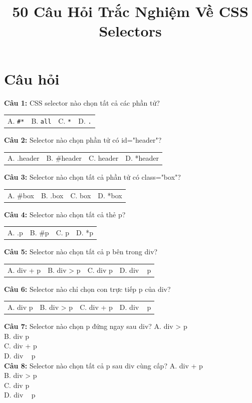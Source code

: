 \documentclass[12pt,a4paper]{article}
\title{50 Câu Hỏi Trắc Nghiệm Về CSS Selectors}
\date{}
\begin{document}
\maketitle

\section*{Câu hỏi}

\textbf{Câu 1:} CSS selector nào chọn tất cả các phần tử?

\begin{tabularx}{\textwidth}{X X X X}
    A. \texttt{\#*} & B. \texttt{all} & C. \texttt{*} & D. \texttt{.}
\end{tabularx}

\textbf{Câu 2:} Selector nào chọn phần tử có id="header"?

\begin{tabular}{llll}
    A. .header & B. \#header & C. header & D. *header
\end{tabular}

\textbf{Câu 3:} Selector nào chọn tất cả phần tử có class="box"?
\begin{tabular}{llll}
A. \#box &
B. .box &
C. box &
D. *box
\end{tabular}

\textbf{Câu 4:} Selector nào chọn tất cả thẻ p?
\begin{tabular}{llll}
    A. .p &
    B. \#p &
    C. p &
    D. *p
\end{tabular}

\textbf{Câu 5:} Selector nào chọn tất cả p bên trong div?

\begin{tabular}{llll}
    A. div + p &
    B. div > p &
    C. div p &
    D. div ~ p 
\end{tabular}

\textbf{Câu 6:} Selector nào chỉ chọn con trực tiếp p của div?
\begin{tabular}{llll}
    A. div p &
    B. div > p &
    C. div + p &
    D. div ~ p \\
\end{tabular}

\textbf{Câu 7:} Selector nào chọn p đứng ngay sau div?
A. div > p \\
B. div p \\
C. div + p \\
D. div ~ p \\

\textbf{Câu 8:} Selector nào chọn tất cả p sau div cùng cấp?
A. div + p \\
B. div > p \\
C. div p \\
D. div ~ p \\
\end{document}
